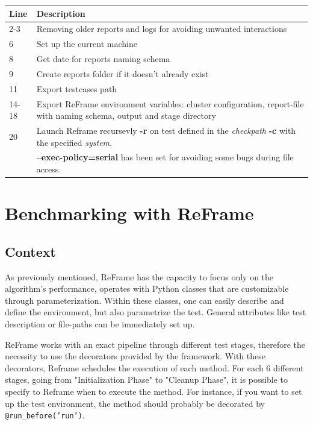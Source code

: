 \documentclass[12pt]{article}
\begin{document}
\begin{tabular}{|l|m{14cm}|}
\hline
\textbf{Line} & \textbf{Description} \\
\hline
2-3  & Removing older reports and logs for avoiding unwanted interactions \\
\hline
6    & Set up the current machine \\
\hline
8    & Get date for reports naming schema \\
\hline
9    & Create reports folder if it doesn't already exist \\
\hline
11   & Export testcases path \\
\hline
14-18   & Export ReFrame environment variables: cluster configuration, report-file with naming schema, output and stage directory\\
\hline
20   & Launch Reframe recursevly \textbf{-r} on test defined in the \textit{checkpath} \textbf{-c} with the specified \textit{system}.\\
     & \textbf{--exec-policy=serial} has been set for avoiding some bugs during file access. \\
\hline
\end{tabular}

\vspace{1cm}

\section{Benchmarking with ReFrame}

\subsection{Context}
As previously mentioned, ReFrame has the capacity to focus only on the algorithm's performance, operates with Python classes that are customizable through parameterization.
Within these classes, one can easily describe and define the environment, but also parametrize the test.
General attributes like test description or file-paths can be immediately set up.

ReFrame works with an exact pipeline through different test stages, therefore the necessity to use the decorators provided by the framework.
With these decorators, Reframe schedules the execution of each method.
For each 6 different stages, going from "Initialization Phase" to "Cleanup Phase", it is possible to specify to Reframe when to execute the method.
For instance, if you want to set up the test environment, the method should probably be decorated by \texttt{@run\_before('run')}.
\end{document}
